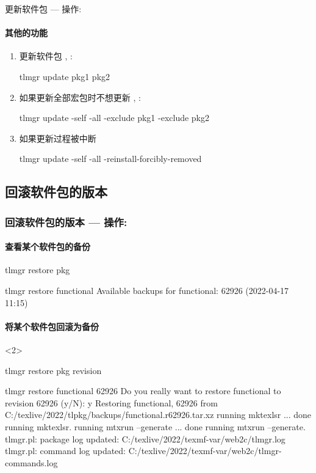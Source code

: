 \begin{frame}[fragile]{更新软件包 --- 操作: }
\framesubtitle{其他的功能}
\begin{enumerate}
\item 更新软件包 , :
\begin{cmdcode}
tlmgr update pkg1 pkg2
\end{cmdcode}
\item 如果更新全部宏包时不想更新 , :
\begin{cmdcode}
tlmgr update -self -all -exclude pkg1 -exclude pkg2
\end{cmdcode}
\item 如果更新过程被中断
\begin{cmdcode}
tlmgr update -self -all -reinstall-forcibly-removed
\end{cmdcode}
\end{enumerate}
\end{frame}


\subsection{回滚软件包的版本}

\begin{frame}[fragile]
  \frametitle{回滚软件包的版本 --- 操作: }
  
  \framesubtitle<1>{查看某个软件包的备份} 
\begin{cmdcode}
tlmgr restore pkg
\end{cmdcode}
\begin{outputcode}
tlmgr restore functional
Available backups for functional: 62926 (2022-04-17 11:15)
\end{outputcode}
  \framesubtitle<2>{将某个软件包回滚为备份}

\begin{uncoverenv}<2>
\begin{cmdcode}
tlmgr restore pkg revision
\end{cmdcode}
\begin{outputcode}
tlmgr restore functional 62926
Do you really want to restore functional to revision 62926 (y/N): y
Restoring functional, 62926 from C:/texlive/2022/tlpkg/backups/functional.r62926.tar.xz
running mktexlsr ...
done running mktexlsr.
running mtxrun --generate ...
done running mtxrun --generate.
tlmgr.pl: package log updated: C:/texlive/2022/texmf-var/web2c/tlmgr.log
tlmgr.pl: command log updated: C:/texlive/2022/texmf-var/web2c/tlmgr-commands.log
\end{outputcode}
\end{uncoverenv}
\end{frame}

